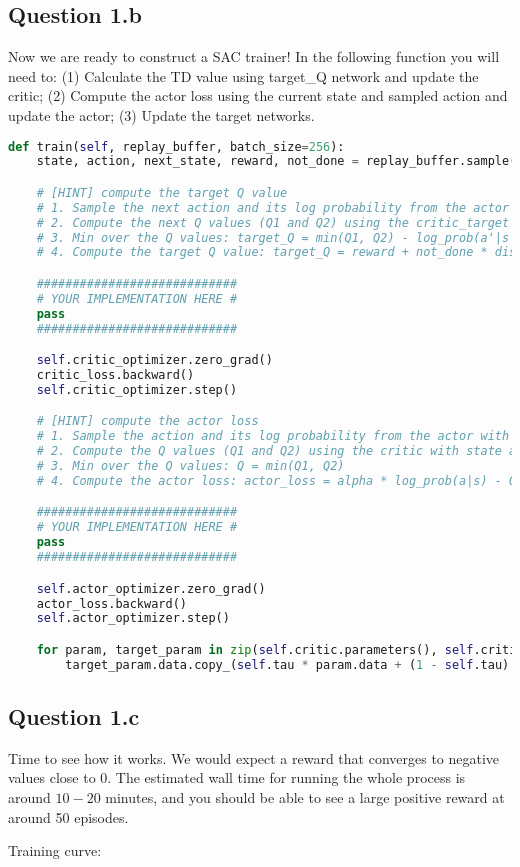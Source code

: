 \documentclass[12pt]{article}
\begin{document}
\subsection*{Question 1.b} 
Now we are ready to construct a SAC trainer! In the following function you will need to: (1) Calculate the TD value using target\_Q network and update the critic; (2) Compute the actor loss using the current state and sampled action and update the actor; (3) Update the target networks.
\begin{solution}
\begin{lstlisting}[language=Python]
def train(self, replay_buffer, batch_size=256):
    state, action, next_state, reward, not_done = replay_buffer.sample(batch_size)

    # [HINT] compute the target Q value
    # 1. Sample the next action and its log probability from the actor with next_state
    # 2. Compute the next Q values (Q1 and Q2) using the critic_target with next_state and next_action
    # 3. Min over the Q values: target_Q = min(Q1, Q2) - log_prob(a'|s') * alpha
    # 4. Compute the target Q value: target_Q = reward + not_done * discount * target_Q

    ############################
    # YOUR IMPLEMENTATION HERE #
    pass
    ############################

    self.critic_optimizer.zero_grad()
    critic_loss.backward()
    self.critic_optimizer.step()

    # [HINT] compute the actor loss
    # 1. Sample the action and its log probability from the actor with state
    # 2. Compute the Q values (Q1 and Q2) using the critic with state and action
    # 3. Min over the Q values: Q = min(Q1, Q2)
    # 4. Compute the actor loss: actor_loss = alpha * log_prob(a|s) - Q

    ############################
    # YOUR IMPLEMENTATION HERE #
    pass
    ############################

    self.actor_optimizer.zero_grad()
    actor_loss.backward()
    self.actor_optimizer.step()

    for param, target_param in zip(self.critic.parameters(), self.critic_target.parameters()):
        target_param.data.copy_(self.tau * param.data + (1 - self.tau) * target_param.data)
\end{lstlisting}
\end{solution}

\subsection*{Question 1.c} 
Time to see how it works. We would expect a reward that converges to negative values close to 0. The estimated wall time for running the whole process is around $10-20$ minutes, and you should be able to see a large positive reward at around 50 episodes. 
\begin{solution}
Training curve:
\end{solution}
\end{document}

